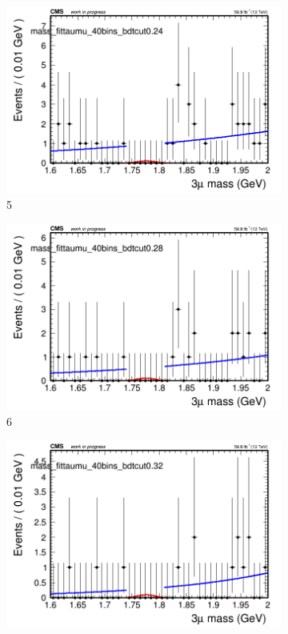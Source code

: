 \begin{figure}[h!]
\begin{subfigure}{0.2\textwidth}
        \includegraphics[width=\textwidth]{unfixed_exp/plots/taumu/massfit_taumu_40bins_bdtcut0.24.png}
        \caption{5}
    \end{subfigure}
    \begin{subfigure}{0.2\textwidth}
        \includegraphics[width=\textwidth]{unfixed_exp/plots/taumu/massfit_taumu_40bins_bdtcut0.28.png}
        \caption{6}
    \end{subfigure}
    \begin{subfigure}{0.2\textwidth}
        \includegraphics[width=\textwidth]{unfixed_exp/plots/taumu/massfit_taumu_40bins_bdtcut0.32.png}

\end{subfigure}
\end{figure}
